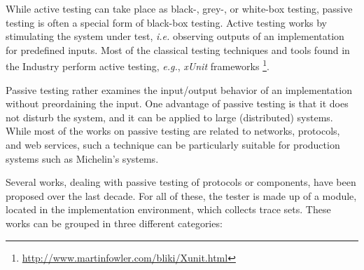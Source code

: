 While active testing can take place as black-, grey-, or white-box
testing, passive testing is often a special form of black-box
testing. Active testing works by stimulating the system under
test, \emph{i.e.} observing outputs of an implementation for predefined
inputs. Most of the classical testing techniques and tools found
in the Industry perform active testing, \emph{e.g.}, \textit{xUnit}
frameworks
\footnote{\url{http://www.martinfowler.com/bliki/Xunit.html}}.

Passive testing rather examines the input/output behavior of an
implementation without preordaining the input. One advantage of
passive testing is that it does not disturb the system, and it
can be applied to large (distributed) systems. While most of the
works on passive testing are related to networks, protocols, and
web services, such a technique can be particularly suitable for
production systems such as Michelin's systems.

Several works, dealing with passive testing of protocols or
components, have been proposed over the last decade. For all of
these, the tester is made up of a module, located in the
implementation environment, which collects trace sets. These
works can be grouped in three different categories:

